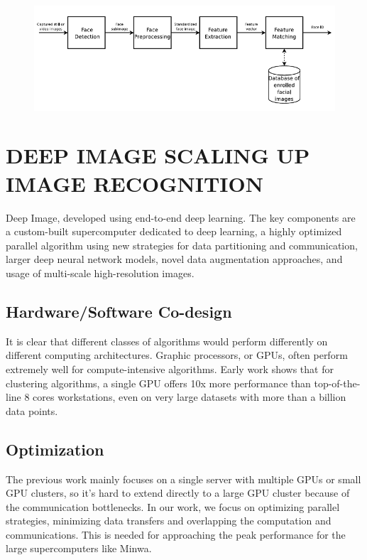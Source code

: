 \documentclass[12pt,letterpaper, onecolumn]{exam}
\begin{document}
    \begin{figure}[htp]
            \centering
            \includegraphics[width=15cm]{image_2}
            \label{fig:steps}
        \end{figure}
    
\section{DEEP IMAGE SCALING UP IMAGE RECOGNITION }
    Deep Image, developed using end-to-end deep learning. The key components are a custom-built supercomputer dedicated to deep learning, a highly optimized parallel algorithm using new strategies for data partitioning and communication, larger deep neural network models, novel data augmentation approaches, and usage of multi-scale high-resolution images.
    
    \subsection{Hardware/Software Co-design }
    It is clear that different classes of algorithms would perform differently on different computing architectures. Graphic processors, or GPUs, often perform extremely well for compute-intensive algorithms. Early work shows that for clustering algorithms, a single GPU offers 10x more performance than top-of-the-line 8 cores workstations, even on very large datasets with more than a billion data points. 
    
    \subsection{Optimization }
    The previous work mainly focuses on a single server with multiple GPUs or small GPU clusters, so it's hard to extend directly to a large GPU cluster because of the communication bottlenecks. In our work, we focus on optimizing parallel strategies, minimizing data transfers and overlapping the computation and communications. This is needed for approaching the peak performance for the large supercomputers like Minwa. 
    
\end{document}
